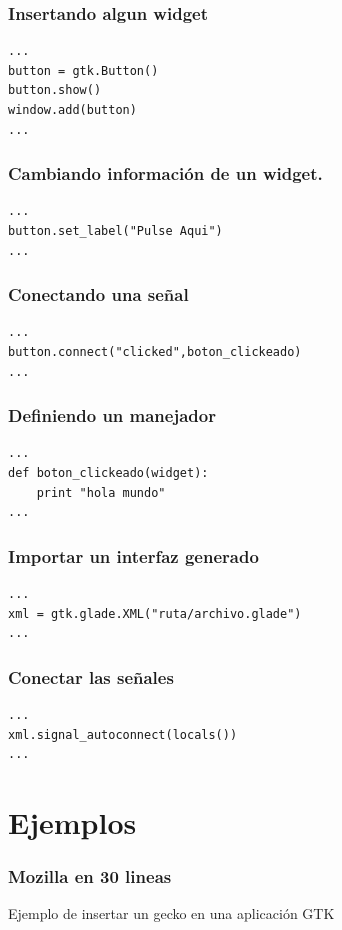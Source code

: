 \documentclass[10pt]{beamer}
\begin{document}
  \begin{frame}[containsverbatim]
    \frametitle{Insertando algun widget}
    \begin{verbatim}
...
button = gtk.Button()
button.show()
window.add(button)
...
    \end{verbatim}
  
  \end{frame}
  
  \begin{frame}[containsverbatim]
    \frametitle{Cambiando información de un widget.}
    \begin{verbatim}
...
button.set_label("Pulse Aqui")
...
    \end{verbatim}
  \end{frame}
  
  \begin{frame}[containsverbatim]
    \frametitle{Conectando una señal}
    \begin{verbatim}
...
button.connect("clicked",boton_clickeado)
...
    \end{verbatim}
  \end{frame}

  \begin{frame}[containsverbatim]
    \frametitle{Definiendo un manejador}
    \begin{verbatim}
...
def boton_clickeado(widget):
	print "hola mundo"
...
    \end{verbatim}
  \end{frame}

  \begin{frame}[containsverbatim]
    \frametitle{Importar un interfaz generado}
    \begin{verbatim}
...
xml = gtk.glade.XML("ruta/archivo.glade")
...
    \end{verbatim}
  \end{frame}

  \begin{frame}[containsverbatim]
    \frametitle{Conectar las señales}
    \begin{verbatim}
...
xml.signal_autoconnect(locals())
...
    \end{verbatim}
  \end{frame}

  \section{Ejemplos}

  \begin{frame}[containsverbatim]
    \frametitle{Mozilla en 30 lineas}
    Ejemplo de insertar un gecko en una aplicación GTK
  \end{frame}
\end{document}
